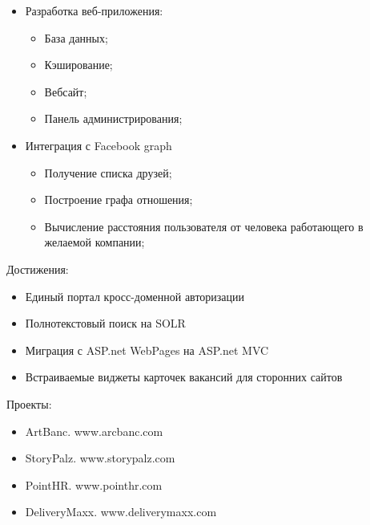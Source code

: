 \documentclass[11pt,a4paper,sans]{moderncv}        %
\begin{document}
\begin{itemize}%
\item Разработка веб-приложения:%
 \begin{itemize}%
  \item База данных;%
  \item Кэширование;%
  \item Вебсайт;%
  \item Панель администрирования;%
  \end{itemize}%
\item Интеграция с Facebook graph%
 \begin{itemize}%
  \item Получение списка друзей;%
  \item Построение графа отношения;%
  \item Вычисление расстояния пользователя от человека работающего в желаемой компании;%
 \end{itemize}
\end{itemize}
Достижения:%
\begin{itemize}%
\item Единый портал кросс-доменной авторизации%
\item Полнотекстовый поиск на SOLR%
\item Миграция с ASP.net WebPages на ASP.net MVC%
\item Встраиваемые виджеты карточек вакансий для сторонних сайтов%
\end{itemize}
Проекты:%
\begin{itemize}%
\item ArtBanc. www.arcbanc.com%
\item StoryPalz. www.storypalz.com%
\item PointHR. www.pointhr.com%
\item DeliveryMaxx. www.deliverymaxx.com%
\end{itemize}
\end{document}
